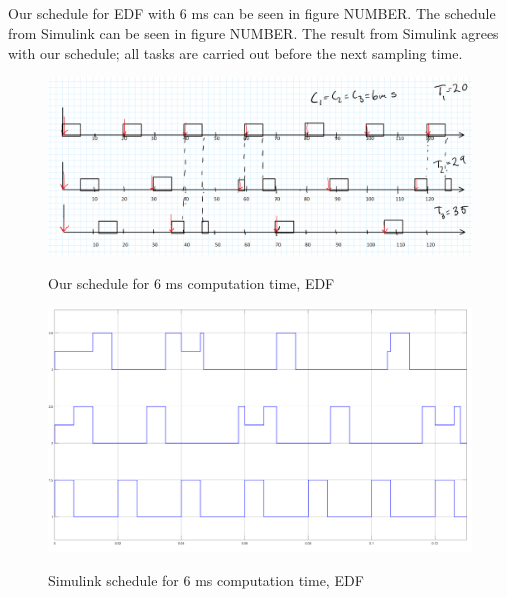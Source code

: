 \documentclass[12pt,a4paper]{article}
\begin{document}
\subsection{} 
Our schedule for EDF with 6 ms can be seen in figure NUMBER. The schedule from Simulink can be seen in figure NUMBER. The result from Simulink agrees with our schedule; all tasks are carried out before the next sampling time.
\begin{center}
	\begin{figure}
	\includegraphics[scale=0.5]{ex641.png}
	\label{fig:ex641}
	\caption{Our schedule for 6 ms computation time, EDF}
	\end{figure}
\end{center}
\begin{center}
	\begin{figure}
	\includegraphics[scale=0.2]{ex642.png}
	\label{fig:ex642}
	\caption{Simulink schedule for 6 ms computation time, EDF}
	\end{figure}
\end{center}
\end{document}
